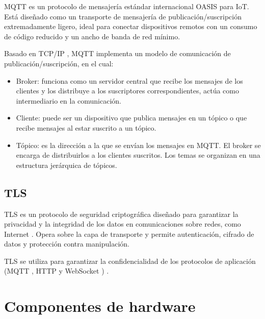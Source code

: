 MQTT es un protocolo de mensajería estándar internacional OASIS
\cite{OASIS_MQTT_Standard} para IoT. Está diseñado como un transporte de
mensajería de publicación/suscripción extremadamente ligero, ideal para
conectar dispositivos remotos con un consumo de código reducido y un ancho de
banda de red mínimo.

Basado en TCP/IP \cite{AWS_MQTT}, MQTT implementa un modelo de comunicación de
publicación/suscripción, en el cual:

\begin{itemize}
	\item Broker: funciona como un servidor central que recibe los mensajes de los
	      clientes y los distribuye a los suscriptores correspondientes, actúa como
	      intermediario en la comunicación.
	\item Cliente: puede ser un dispositivo que publica mensajes en un tópico o que
	      recibe mensajes al estar suscrito a un tópico.
	\item Tópico: es la dirección a la que se envían los mensajes en MQTT. El broker se
	      encarga de distribuirlos a los clientes suscritos. Los temas se organizan en
	      una estructura jerárquica de tópicos.
\end{itemize}

\subsection{TLS}

TLS es un protocolo de seguridad criptográfica diseñado para garantizar la
privacidad y la integridad de los datos en comunicaciones sobre redes, como
Internet \cite{tls}. Opera sobre la capa de transporte y permite autenticación,
cifrado de datos y protección contra manipulación.

TLS se utiliza para garantizar la confidencialidad de los protocolos de
aplicación (MQTT \cite{OASIS_MQTT_Standard}, HTTP \cite{IBMTCPIP} y WebSocket
\cite{RFC6455}) \cite{awsiot_tls}.


\section{Componentes de hardware}\label{sec:hardware}

